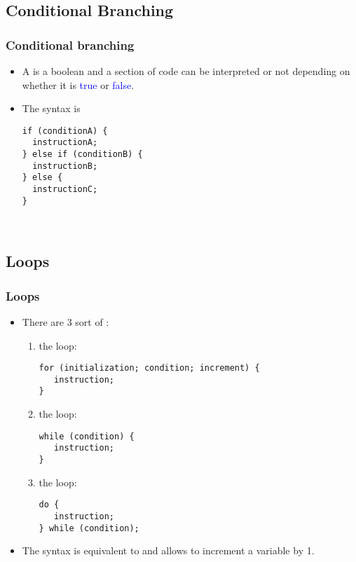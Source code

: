 \subsection{Conditional Branching}
\begin{frame}[fragile]
  \frametitle<presentation>{Conditional branching}
  \begin{itemize}
  \item A  is a boolean and a section of code
    can be interpreted or not depending on whether it is
    \textcolor{blue}{true} or \textcolor{blue}{false}.
  \item The syntax is
\begin{verbatim}
if (conditionA) {
  instructionA;
} else if (conditionB) {
  instructionB;
} else {
  instructionC;
}
\end{verbatim}
  \end{itemize}
\end{frame}

\begin{frame}
  \begin{example}~\par

    
  \end{example}
\end{frame}

\subsection{Loops}
\begin{frame}[fragile]
  \frametitle<presentation>{Loops}
  \begin{itemize}
  \item There are 3 sort of :
    \begin{enumerate}
    \item the  loop:
      \begin{verbatim}
for (initialization; condition; increment) {
   instruction;
}
    \end{verbatim}
    \item the  loop:
      \begin{verbatim}
while (condition) {
   instruction;
}
    \end{verbatim}
    \item the  loop:
      \begin{verbatim}
do {
   instruction;
} while (condition);
    \end{verbatim}
    \end{enumerate}
  \item The syntax  is equivalent to  and
    allows to increment a variable by 1.
  \end{itemize}
\end{frame}

